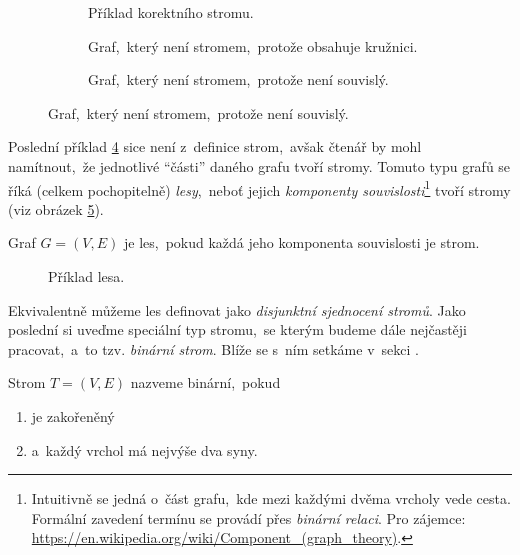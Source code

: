 \begin{figure}[ht]
    \centering
    \begin{subfigure}{6cm}
        \centering
        
        \caption{Příklad korektního stromu.}
        \label{subfig:strom_priklad1}
    \end{subfigure}
    \qquad
    \begin{subfigure}{6cm}
        \centering
        
        \caption{Graf,~který není stromem,~protože obsahuje kružnici.}
        \label{subfig:strom_priklad2}
    \end{subfigure}
    \qquad
    \begin{subfigure}{6cm}
        \centering
        
        \caption{Graf,~který není stromem,~protože není souvislý.}
        \label{subfig:strom_priklad3}
    \end{subfigure}
\end{figure}

Poslední příklad \ref{subfig:strom_priklad3} sice není z~definice strom,~avšak čtenář by mohl namítnout,~že jednotlivé ``části'' daného grafu tvoří stromy. Tomuto typu grafů se říká (celkem pochopitelně) \emph{lesy},~neboť jejich \emph{komponenty souvislosti}\footnote{Intuitivně se jedná o~část grafu,~kde mezi každými dvěma vrcholy vede cesta. Formální zavedení termínu se provádí přes \emph{binární relaci}. Pro zájemce: \url{https://en.wikipedia.org/wiki/Component_(graph_theory)}.} tvoří stromy (viz obrázek \ref{fig:les}).

\begin{definition}[Les]\label{def:les}
    Graf $G=(V,E)$ je les,~pokud každá jeho komponenta souvislosti je strom.
\end{definition}

\begin{figure}[ht]
    \centering
    
    \caption{Příklad lesa.}
    \label{fig:les}
\end{figure}

Ekvivalentně můžeme les definovat jako \emph{disjunktní sjednocení stromů}. Jako poslední si uveďme speciální typ stromu,~se kterým budeme dále nejčastěji pracovat,~a~to tzv. \emph{binární strom}. Blíže se s~ním setkáme v~sekci .

\begin{definition}\label{def:binarni_strom}
    Strom $T=(V,E)$ nazveme binární,~pokud
    \begin{enumerate}[label=(\roman*)]
        \item je zakořeněný
        \item a~každý vrchol má nejvýše dva syny.
    \end{enumerate}
\end{definition}

